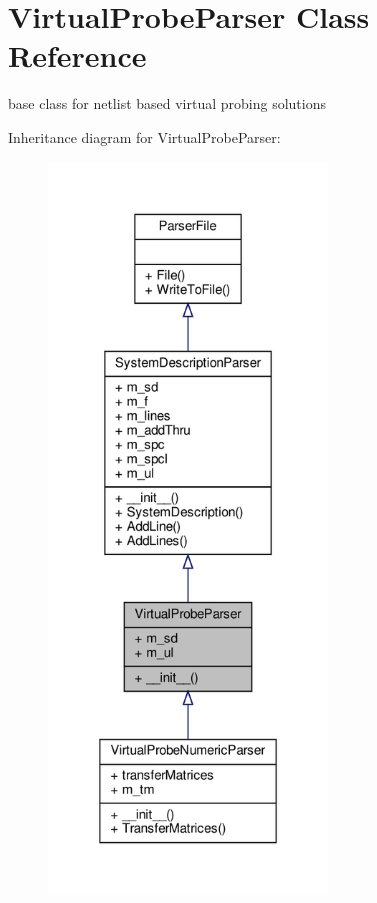 \hypertarget{classSignalIntegrity_1_1Parsers_1_1VirtualProbeParser_1_1VirtualProbeParser}{}\section{Virtual\+Probe\+Parser Class Reference}
\label{classSignalIntegrity_1_1Parsers_1_1VirtualProbeParser_1_1VirtualProbeParser}


base class for netlist based virtual probing solutions  




Inheritance diagram for Virtual\+Probe\+Parser\+:\nopagebreak
\begin{figure}[H]
\begin{center}
\leavevmode
\includegraphics[height=550pt]{classSignalIntegrity_1_1Parsers_1_1VirtualProbeParser_1_1VirtualProbeParser__inherit__graph}
\end{center}
\end{figure}


